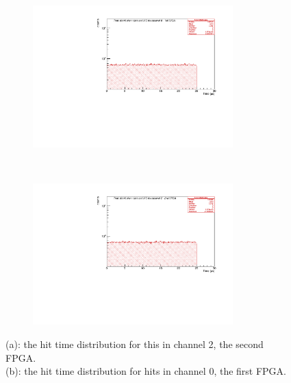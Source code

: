 \begin{figure}[!h]
  \begin{subfigure}[b]{\textwidth}
      \centering
      \includegraphics[width=0.85\textwidth]{figures/pdf/figure_00001_timedistr_roc_simulation_10538.pdf}
      \caption{}
      \label{fig:ttt1}
  \end{subfigure}
\\
  \begin{subfigure}[b]{\textwidth}
      \centering
      \includegraphics[width=0.85\textwidth]{figures/pdf/figure_00012_timedistr_roc_simulation_ch2_105038.pdf}
      \caption{}
      \label{fig:ttt2}
  \end{subfigure}
     \caption{(a): the hit time distribution for this in channel 2, the second FPGA. 
     \\
     (b): the hit time distribution for hits in channel 0, the first FPGA.}
     \label{fig:4}
\end{figure}

